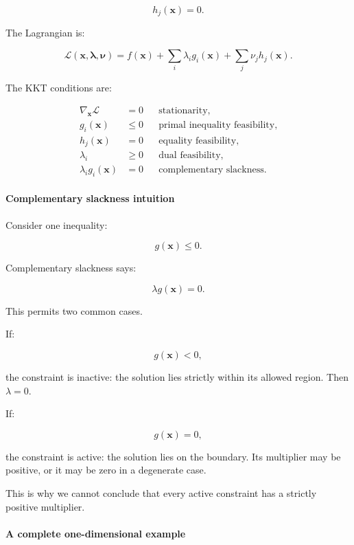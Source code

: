 \[
h_j(\mathbf x)=0.
\]

The Lagrangian is:

\[
\mathcal L(\mathbf x,\boldsymbol\lambda,\boldsymbol\nu) = f(\mathbf x)+ \sum_i\lambda_i g_i(\mathbf x)+ \sum_j\nu_jh_j(\mathbf x).
\]

The KKT conditions are:

\[
\boxed{ \begin{aligned} \nabla_{\mathbf x}\mathcal L&=0 &&\text{stationarity},\\ g_i(\mathbf x)&\le0 &&\text{primal inequality feasibility},\\ h_j(\mathbf x)&=0 &&\text{equality feasibility},\\ \lambda_i&\ge0 &&\text{dual feasibility},\\ \lambda_i g_i(\mathbf x)&=0 &&\text{complementary slackness}. \end{aligned} }
\]

\paragraph{Complementary slackness intuition}\label{02-foundations-ii-ch026-complementary-slackness-intuition}

Consider one inequality:

\[
g(\mathbf x)\le0.
\]

Complementary slackness says:

\[
\lambda g(\mathbf x)=0.
\]

This permits two common cases.

If:

\[
g(\mathbf x)<0,
\]

the constraint is inactive: the solution lies strictly within its allowed region. Then \(\lambda=0\).

If:

\[
g(\mathbf x)=0,
\]

the constraint is active: the solution lies on the boundary. Its multiplier may be positive, or it may be zero in a degenerate case.

This is why we cannot conclude that every active constraint has a strictly positive multiplier.

\paragraph{A complete one-dimensional example}\label{02-foundations-ii-ch026-a-complete-one-dimensional-example}

